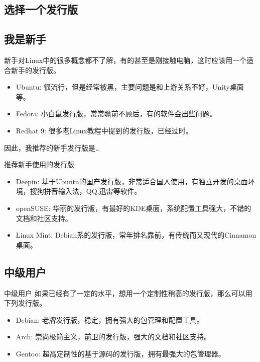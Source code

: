 \documentclass{beamer}
\begin{document}
\begin{frame}
\section{选择一个发行版}
\subsection{我是新手}
新手对Linux中的很多概念都不了解，有的甚至是刚接触电脑，这时应该用一个适合新手的发行版。
\begin{itemize}
\item Ubuntu: 很流行，但是经常被黑，主要问题是和上游关系不好，Unity桌面等。
\item Fedora: 小白鼠发行版，常常瞻前不顾后，有的软件会出些问题。
\item Redhat 9: 很多老Linux教程中提到的发行版，已经过时。
\end{itemize}

因此，我推荐的新手发行版是\ldots
\end{frame}

\begin{frame}{推荐新手使用的发行版}
\begin{itemize}
\item Deepin: 基于Ubuntu的国产发行版，非常适合国人使用，有独立开发的桌面环境，搜狗拼音输入法，QQ,迅雷等软件。
\item openSUSE: 华丽的发行版，有最好的KDE桌面，系统配置工具强大，不错的文档和社区支持。
\item Linux Mint: Debian系的发行版，常年排名靠前，有传统而又现代的Cinnamon桌面。
\end{itemize}
\end{frame}

\subsection{中级用户}
\begin{frame}{中级用户}
如果已经有了一定的水平，想用一个定制性稍高的发行版，那么可以用下列发行版。
\begin{itemize}
\item Debian: 老牌发行版，稳定，拥有强大的包管理和配置工具。
\item Arch: 崇尚极简主义，前卫的发行版，强大的文档和社区支持。
\item Gentoo: 超高定制性的基于源码的发行版，拥有最强大的包管理器。
\end{itemize}

\end{frame}
\end{document}

